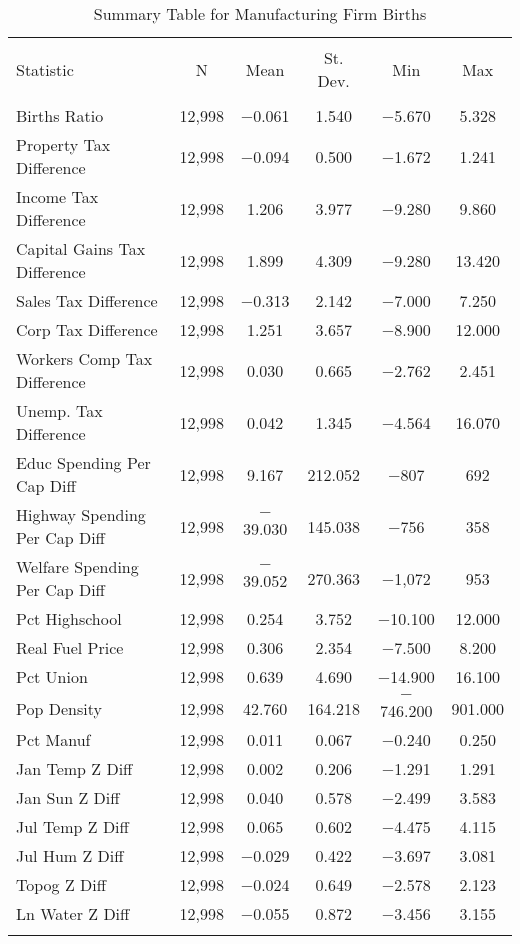 
\begin{table}[!htbp] \centering 
  \caption{Summary Table for  Manufacturing Firm Births} 
  \label{31-33summary} 
\begin{tabular}{@{\extracolsep{5pt}}lccccc} 
\\[-1.8ex]\hline 
\hline \\[-1.8ex] 
Statistic & \multicolumn{1}{c}{N} & \multicolumn{1}{c}{Mean} & \multicolumn{1}{c}{St. Dev.} & \multicolumn{1}{c}{Min} & \multicolumn{1}{c}{Max} \\ 
\hline \\[-1.8ex] 
Births Ratio & 12,998 & $-$0.061 & 1.540 & $-$5.670 & 5.328 \\ 
Property Tax Difference & 12,998 & $-$0.094 & 0.500 & $-$1.672 & 1.241 \\ 
Income Tax Difference & 12,998 & 1.206 & 3.977 & $-$9.280 & 9.860 \\ 
Capital Gains Tax Difference & 12,998 & 1.899 & 4.309 & $-$9.280 & 13.420 \\ 
Sales Tax Difference & 12,998 & $-$0.313 & 2.142 & $-$7.000 & 7.250 \\ 
Corp Tax Difference & 12,998 & 1.251 & 3.657 & $-$8.900 & 12.000 \\ 
Workers Comp Tax Difference & 12,998 & 0.030 & 0.665 & $-$2.762 & 2.451 \\ 
Unemp. Tax Difference & 12,998 & 0.042 & 1.345 & $-$4.564 & 16.070 \\ 
Educ Spending Per Cap Diff & 12,998 & 9.167 & 212.052 & $-$807 & 692 \\ 
Highway Spending Per Cap Diff & 12,998 & $-$39.030 & 145.038 & $-$756 & 358 \\ 
Welfare Spending Per Cap Diff & 12,998 & $-$39.052 & 270.363 & $-$1,072 & 953 \\ 
Pct Highschool & 12,998 & 0.254 & 3.752 & $-$10.100 & 12.000 \\ 
Real Fuel Price & 12,998 & 0.306 & 2.354 & $-$7.500 & 8.200 \\ 
Pct Union & 12,998 & 0.639 & 4.690 & $-$14.900 & 16.100 \\ 
Pop Density & 12,998 & 42.760 & 164.218 & $-$746.200 & 901.000 \\ 
Pct Manuf & 12,998 & 0.011 & 0.067 & $-$0.240 & 0.250 \\ 
Jan Temp Z Diff & 12,998 & 0.002 & 0.206 & $-$1.291 & 1.291 \\ 
Jan Sun Z Diff & 12,998 & 0.040 & 0.578 & $-$2.499 & 3.583 \\ 
Jul Temp Z Diff & 12,998 & 0.065 & 0.602 & $-$4.475 & 4.115 \\ 
Jul Hum Z Diff & 12,998 & $-$0.029 & 0.422 & $-$3.697 & 3.081 \\ 
Topog Z Diff & 12,998 & $-$0.024 & 0.649 & $-$2.578 & 2.123 \\ 
Ln Water Z Diff & 12,998 & $-$0.055 & 0.872 & $-$3.456 & 3.155 \\ 
\hline \\[-1.8ex] 
\end{tabular} 
\end{table} 
